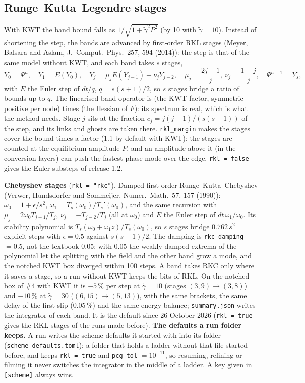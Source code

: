 \documentclass[11pt,a4paper]{article}
\newcommand{\code}[1]{\texttt{#1}}
\newcommand{\gt}{\tilde\gamma}
\begin{document}
\subsection{Runge--Kutta--Legendre stages}

With KWT the band bound falls as $1/\sqrt{1+\gt^2P^2}$ (by 10 with $\gt = 10$). Instead of shortening the step, the
bands are advanced by first-order RKL stages (Meyer, Balsara and Aslam, J.\ Comput.\ Phys.\ 257, 594 (2014)): the step
is that of the same model without KWT, and each band takes $s$ stages,
\begin{equation}
  Y_0 = \Psi^n,\quad Y_1 = E(Y_0),\quad Y_j = \mu_j E(Y_{j-1}) + \nu_j Y_{j-2},\quad
  \mu_j = \frac{2j-1}{j},\ \nu_j = \frac{1-j}{j},\quad \Psi^{n+1} = Y_s ,
\end{equation}
with $E$ the Euler step of $dt/q$, $q = s(s+1)/2$, so $s$ stages bridge a ratio of bounds up to $q$. The linearised band
operator is (the KWT factor, symmetric positive per node) times (the Hessian of $F$): its spectrum is real, which is what
the method needs. Stage $j$ sits at the fraction $c_j = j(j+1)/(s(s+1))$ of the step, and its links and ghosts are taken
there. \code{rkl\_margin} makes the stages cover the bound times a factor (1.1 by default with KWT): the stages are
counted at the equilibrium amplitude $P$, and an amplitude above it (in the conversion layers) can push the fastest
phase mode over the edge. \code{rkl = false} gives the Euler substeps of release 1.2.

\textbf{Chebyshev stages} (\code{rkl = "rkc"}). Damped first-order Runge--Kutta--Chebyshev (Verwer, Hundsdorfer and Sommeijer,
Numer.\ Math.\ 57, 157 (1990)): $\omega_0 = 1 + \epsilon/s^2$, $\omega_1 = T_s(\omega_0)/T_s'(\omega_0)$, and the same recursion with
$\mu_j = 2\omega_0T_{j-1}/T_j$, $\nu_j = -T_{j-2}/T_j$ (all at $\omega_0$) and $E$ the Euler step of $dt\,\omega_1/\omega_0$. Its
stability polynomial is $T_s(\omega_0 + \omega_1 z)/T_s(\omega_0)$, so $s$ stages bridge $0.762\,s^2$ explicit steps with
$\epsilon = 0.5$ against $s(s+1)/2$. The damping is \code{rkc\_damping} $= 0.5$, not the textbook 0.05: with 0.05 the weakly damped
extrema of the polynomial let the splitting with the field and the other band grow a mode, and the notched KWT box diverged
within 100 steps. A band takes RKC only where it saves a stage, so a run without KWT keeps the bits of RKL. On the notched box
of \#4 with KWT it is $-5\,\%$ per step at $\gt = 10$ (stages $(3,9)\to(3,8)$) and $-10\,\%$ at $\gt = 30$ ($(6,15)\to(5,13)$),
with the same brackets, the same delay of the first slip (0.05\,\%) and the same energy balance; \code{summary.json} writes the
integrator of each band. It is the default since 26 October 2026 (\code{rkl = true} gives the RKL stages of the runs made before).
\textbf{The defaults a run folder keeps.} A run writes the scheme defaults it started with into its folder
(\code{scheme\_defaults.toml}); a folder that holds a ladder without that file started before, and keeps \code{rkl = true} and
\code{pcg\_tol} $= 10^{-11}$, so resuming, refining or filming it never switches the integrator in the middle of a ladder. A key
given in \code{[scheme]} always wins.
\end{document}
